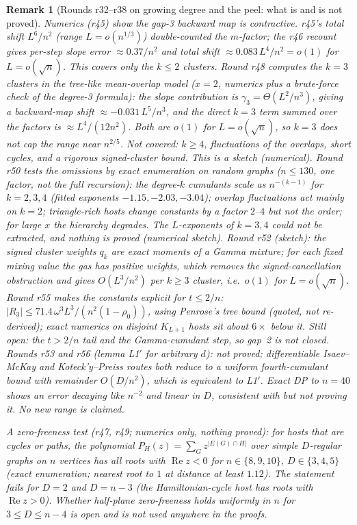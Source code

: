 \documentclass[11pt]{article}
\newtheorem{remark}[theorem]{Remark}
\begin{document}
\begin{remark}[Rounds r32--r38 on growing degree and the peel: what is and is not proved]
Numerics (r45) show the gap-3 backward map is contractive. r45's total shift \(L^6/n^2\) (range \(L=o(n^{1/3})\)) double-counted the \(m\)-factor; the r46 recount gives per-step slope error \(\approx0.37/n^2\) and total shift \(\approx0.083\,L^4/n^2=o(1)\) for \(L=o(\sqrt n)\). This covers only the \(k\le2\) clusters. Round r48 computes the \(k=3\) clusters in the tree-like mean-overlap model (\(x=2\), numerics plus a brute-force check of the degree-3 formula): the slope contribution is \(\gamma_3=\Theta(L^2/n^3)\), giving a backward-map shift \(\approx-0.031\,L^5/n^3\), and the direct \(k=3\) term summed over the factors is \(\approx L^4/(12n^2)\). Both are \(o(1)\) for \(L=o(\sqrt n)\), so \(k=3\) does not cap the range near \(n^{2/5}\). Not covered: \(k\ge4\), fluctuations of the overlaps, short cycles, and a rigorous signed-cluster bound. This is a sketch (numerical). Round r50 tests the omissions by exact enumeration on random graphs ($n\le130$, one factor, not the full recursion): the degree-$k$ cumulants scale as $n^{-(k-1)}$ for $k=2,3,4$ (fitted exponents $-1.15,-2.03,-3.04$); overlap fluctuations act mainly on $k=2$; triangle-rich hosts change constants by a factor $2$--$4$ but not the order; for large $x$ the hierarchy degrades. The $L$-exponents of $k=3,4$ could not be extracted, and nothing is proved (numerical sketch). Round r52 (sketch): the signed cluster weights \(q_k\) are exact moments of a Gamma mixture; for each fixed mixing value the gas has positive weights, which removes the signed-cancellation obstruction and gives \(O(L^3/n^2)\) per \(k\ge3\) cluster, i.e.\ \(o(1)\) for \(L=o(\sqrt n)\). Round r55 makes the constants explicit for \(t\le2/n\): \(|R_3|\le71.4\,\omega^3L^3/(n^2(1-\rho_0))\), using Penrose's tree bound (quoted, not re-derived); exact numerics on disjoint \(K_{L+1}\) hosts sit about \(6\times\) below it. Still open: the \(t>2/n\) tail and the Gamma-cumulant step, so gap~2 is \emph{not} closed. Rounds r53 and r56 (lemma L1\('\) for arbitrary \(d\)): not proved; differentiable Isaev--McKay and Koteck'y--Preiss routes both reduce to a uniform fourth-cumulant bound with remainder \(O(D/n^2)\), which is equivalent to L1\('\). Exact DP to \(n=40\) shows an error decaying like \(n^{-2}\) and linear in \(D\), consistent with but not proving it. No new range is claimed.

A zero-freeness test (r47, r49; numerics only, nothing proved): for hosts that are cycles or paths, the polynomial \(P_H(z)=\sum_G z^{|E(G)\cap H|}\) over simple \(D\)-regular graphs on \(n\) vertices has all roots with \(\operatorname{Re}z<0\) for \(n\in\{8,9,10\}\), \(D\in\{3,4,5\}\) (exact enumeration; nearest root to \(1\) at distance at least \(1.12\)). The statement fails for \(D=2\) and \(D=n-3\) (the Hamiltonian-cycle host has roots with \(\operatorname{Re}z>0\)). Whether half-plane zero-freeness holds uniformly in \(n\) for \(3\le D\le n-4\) is open and is not used anywhere in the proofs.


\end{remark}
\end{document}
